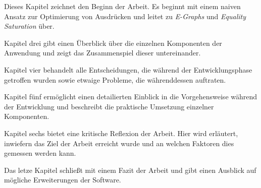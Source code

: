 \vspace{-2mm}

Dieses Kapitel zeichnet den Beginn der Arbeit. Es beginnt mit einem naiven Ansatz zur Optimierung von Ausdrücken und leitet zu \textit{E-Graphs} und \textit{Equality Saturation} über.

\vspace{6mm}

\vspace{-2mm}

Kapitel drei gibt einen Überblick über die einzelnen Komponenten der Anwendung und zeigt das Zusammenspiel dieser untereinander.
\vspace{6mm}

\vspace{-2mm}

Kapitel vier behandelt alle Entscheidungen, die während der Entwicklungsphase getroffen wurden sowie etwaige Probleme, die währenddessen auftraten.
\vspace{6mm}

\vspace{-2mm}

Kapitel fünf ermöglicht einen detailierten Einblick in die Vorgehensweise während der Entwicklung und beschreibt die praktische Umsetzung einzelner Komponenten.

\vspace{6mm}

\vspace{-2mm}

Kapitel sechs bietet eine kritische Reflexion der Arbeit. Hier wird erläutert, inwiefern das Ziel der Arbeit erreicht wurde und an welchen Faktoren dies gemessen werden kann.

\vspace{6mm}

\vspace{-2mm}

Das letze Kapitel schließt mit einem Fazit der Arbeit und gibt einen Ausblick auf mögliche Erweiterungen der Software.